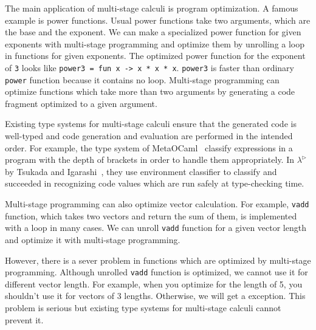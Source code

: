 
The main application of multi-stage calculi is program optimization. 
A famous example is power functions.
Usual power functions take two arguments, which are the base and the exponent.
We can make a specialized power function for given exponents with multi-stage programming and 
optimize them by unrolling a loop in functions for given exponents.
The optimized power function for the exponent of \verb|3| looks like \verb|power3 = fun x -> x * x * x|.
\verb|power3| is faster than ordinary \verb|power| function because it contains no loop.
Multi-stage programming can optimize functions which take more than two arguments 
by generating a code fragment optimized to a given argument.


Existing type systems for multi-stage calculi ensure that
the generated code is well-typed and code generation and evaluation are performed in the intended order.
For example, the type system of MetaOCaml~\cite{taha1999multi} classify expressions in a program
with the depth of brackets in order to handle them appropriately.
In $\lambda^\triangleright$ by Tsukada and Igarashi~\cite{Tsukada},
they use environment classifier to classify and 
succeeded in recognizing code values which are run safely at type-checking time.


Multi-stage programming can also optimize vector calculation.
For example, \verb|vadd| function, which takes two vectors and return the sum of them,
is implemented with a loop in many cases.
We can unroll \verb|vadd| function for a given vector length and optimize it with multi-stage programming.


However, there is a sever problem in functions which are optimized by multi-stage programming.
Although unrolled \verb|vadd| function is optimized, we cannot use it for different vector length.
For example, when you optimize for the length of 5, you shouldn't use it for vectors of 3 lengths.
Otherwise, we will get a exception.
This problem is serious but existing type systems for multi-stage calculi cannot prevent it.

